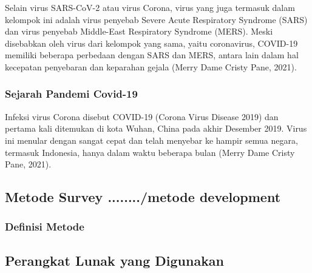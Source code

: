Selain virus SARS-CoV-2 atau virus Corona, virus yang juga termasuk dalam kelompok ini adalah virus penyebab Severe Acute Respiratory Syndrome (SARS) dan virus penyebab Middle-East Respiratory Syndrome (MERS). Meski disebabkan oleh virus dari kelompok yang sama, yaitu coronavirus, COVID-19 memiliki beberapa perbedaan dengan SARS dan MERS, antara lain dalam hal kecepatan penyebaran dan keparahan gejala (Merry Dame Cristy Pane, 2021).

\subsubsection{Sejarah Pandemi Covid-19}
Infeksi virus Corona disebut COVID-19 (Corona Virus Disease 2019) dan pertama kali ditemukan di kota Wuhan, China pada akhir Desember 2019. Virus ini menular dengan sangat cepat dan telah menyebar ke hampir semua negara, termasuk Indonesia, hanya dalam waktu beberapa bulan (Merry Dame Cristy Pane, 2021).


\subsection{Metode Survey ......../metode development}
\subsubsection{Definisi Metode}


\subsection{Perangkat Lunak yang Digunakan}
